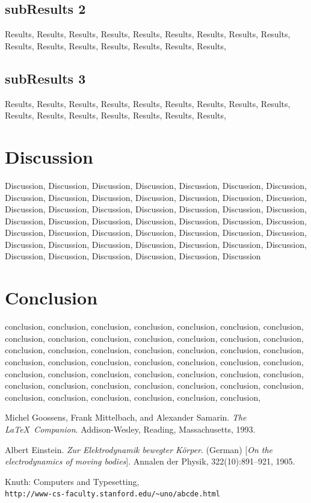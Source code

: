 \documentclass[a4paper]{article}
\begin{document}
\subsection{subResults 2}
Results, Results, Results, Results, Results, Results, Results, Results, Results, Results, Results, Results, Results, Results, Results, Results,

\subsection{subResults 3}
Results, Results, Results, Results, Results, Results, Results, Results, Results, Results, Results, Results, Results, Results, Results, Results,

\section{Discussion} %
\label{Discussion}
Discussion, Discussion, Discussion, Discussion, Discussion, Discussion, Discussion, Discussion, Discussion, Discussion, Discussion, Discussion, Discussion, Discussion, Discussion, Discussion, Discussion, Discussion, Discussion, Discussion, Discussion, Discussion, Discussion, Discussion, Discussion, Discussion, Discussion, Discussion, Discussion, Discussion, Discussion, Discussion, Discussion, Discussion, Discussion, Discussion, Discussion, Discussion, Discussion, Discussion, Discussion, Discussion, Discussion, Discussion, Discussion, Discussion, Discussion, Discussion\cite{latexcompanion} 

\section{Conclusion} %
\label{sec:Conclusion}
conclusion, conclusion, conclusion, conclusion, conclusion, conclusion, conclusion, conclusion, conclusion, conclusion, conclusion, conclusion, conclusion, conclusion, conclusion, conclusion, conclusion, conclusion, conclusion, conclusion, conclusion, conclusion, conclusion, conclusion, conclusion, conclusion, conclusion, conclusion, conclusion, conclusion, conclusion, conclusion, conclusion, conclusion, conclusion, conclusion, conclusion, conclusion, conclusion, conclusion, conclusion, conclusion, conclusion, conclusion, conclusion, conclusion, conclusion, conclusion, 




\begin{thebibliography}{9}
Michel Goossens, Frank Mittelbach, and Alexander Samarin. 
\textit{The \LaTeX\ Companion}. 
Addison-Wesley, Reading, Massachusetts, 1993.
 
Albert Einstein. 
\textit{Zur Elektrodynamik bewegter K{\"o}rper}. (German) 
[\textit{On the electrodynamics of moving bodies}]. 
Annalen der Physik, 322(10):891–921, 1905.
 
Knuth: Computers and Typesetting,
\\\texttt{http://www-cs-faculty.stanford.edu/\~{}uno/abcde.html}
\end{thebibliography}


	
	
	
	
\end{document}
